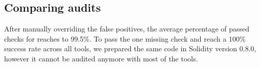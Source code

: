 
\subsection{Comparing audits}
After manually overriding the false positives, the average percentage of passed checks for \sys reaches to 99.5\%. To pass the one missing check and reach a 100\% success rate across all tools, we prepared the same code in Solidity version 0.8.0, however it cannot be audited anymore with most of the tools. 



%

